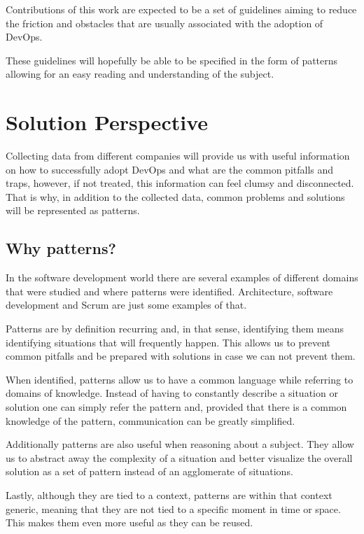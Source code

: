         Contributions of this work are expected to be a set of guidelines aiming to reduce the friction and obstacles that are usually associated with the adoption of DevOps.
        
        These guidelines will hopefully be able to be specified in the form of patterns allowing for an easy reading and understanding of the subject. 
        
        \section{Solution Perspective}

		Collecting data from different companies will provide us with useful information on how to successfully adopt DevOps and what are the common pitfalls and traps, however, if not treated, this information can feel clumsy and disconnected. That is why, in addition to the collected data, common problems and solutions will be represented as patterns.  
    
    		\subsection{Why patterns?}
      		In the software development world there are several examples of different domains that were studied and where patterns were identified. Architecture, software development and Scrum are just some examples of that.
      
    		Patterns are by definition recurring and, in that sense, identifying them means identifying situations that will frequently happen. This allows us to prevent common pitfalls and be prepared with solutions in case we can not prevent them.
    
   	 		When identified, patterns allow us to have a common language while referring to domains of knowledge. Instead of having to constantly describe a situation or solution one can simply refer the pattern and, provided that there is a common knowledge of the pattern, communication can be greatly simplified.
    
    		Additionally patterns are also useful when reasoning about a subject. They allow us to abstract away the complexity of a situation and better visualize the overall solution as a set of pattern instead of an agglomerate of situations.
    
    		Lastly, although they are tied to a context, patterns are within that context generic, meaning that they are not tied to a specific moment in time or space. This makes them even more useful as they can be reused.
    
